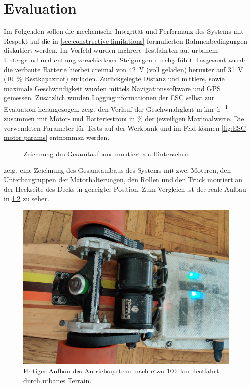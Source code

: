\chapter{Evaluation}
	Im Folgenden sollen die mechanische Integrität und Performanz des Systems mit Respekt auf die in \cref{sec:constructive limitations} formulierten Rahmenbedingungen diskutiert werden.
	Im Vorfeld wurden mehrere Testfahrten auf urbanem Untergrund und entlang verschiedener Steigungen durchgeführt.
	Insgesamt wurde die verbaute Batterie hierbei dreimal von \qty{42}{\volt} (voll geladen) herunter auf \qty{31}{\volt} (\qty{10}{\percent} Restkapazität) entladen.
	Zurückgelegte Distanz und mittlere, sowie maximale Geschwindigkeit wurden mittels Navigationssoftware und GPS gemessen.
	Zusätzlich wurden Logginginformationen der ESC selbst zur Evaluation herangezogen.
	 zeigt den Verlauf der Geschwindigkeit in \unit{\kilo\metre\per\hour} zusammen mit Motor- und Batteriestrom in \unit{\percent} der jeweiligen Maximalwerte.
	Die verwendeten Parameter für Tests auf der Werkbank und im Feld können \cref{fig:ESC motor params} entnommen werden.
	\begin{figure}[h]
		\centering
		
		\caption[Zeichnung des Gesamtaufbaus]{Zeichnung des Gesamtaufbaus montiert als Hinterachse.}
		\label{fig:drivetrain inclined}
	\end{figure}
	 zeigt eine Zeichnung des Gesamtaufbaus des Systems mit zwei Motoren, den Unterbaugruppen der Motorhalterungen, den Rollen und den Truck montiert an der Heckseite des Decks in geneigter Position.
	Zum Vergleich ist der reale Aufbau in \cref{fig:real world assembly} zu sehen.
	\begin{figure}[h]
		\centering
		\includegraphics[angle=180, width=.5\textwidth]{Footage/Pictures/Drivetrain close up v2.jpg}
		\caption[Fertiger Aufbau des Antriebssystems]{Fertiger Aufbau des Antriebssystems nach etwa \qty{100}{\kilo\metre} Testfahrt durch urbanes Terrain.}
		\label{fig:real world assembly}
	\end{figure}

